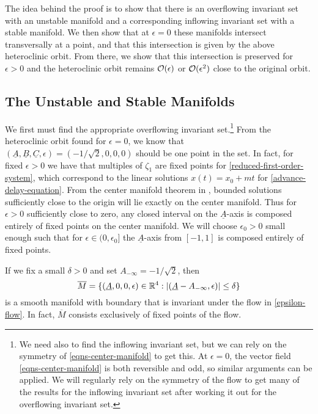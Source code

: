 The idea behind the proof is to show that there is an overflowing invariant set with an unstable manifold and a corresponding inflowing invariant set with a stable manifold. We then show that at \(\epsilon = 0\) these manifolds intersect transversally at a point, and that this intersection is given by the above heteroclinic orbit. From there, we show that this intersection is preserved for \(\epsilon > 0\) and the heteroclinic orbit remains \(\mathcal{O}(\epsilon)\) or \(\mathcal{O}(\epsilon^2)\) close to the original orbit.

\subsection{The Unstable and Stable Manifolds}\label{sec:manifolds}

We first must find the appropriate overflowing invariant set.\footnote{We need also to find the inflowing invariant set, but we can rely on the symmetry of \cref{eqns-center-manifold} to get this. At \(\epsilon = 0\), the vector field \cref{eqns-center-manifold} is both reversible and odd, so similar arguments can be applied. We will regularly rely on the symmetry of the flow to get many of the results for the inflowing invariant set after working it out for the overflowing invariant set.} From the heteroclinic orbit found for \(\epsilon = 0\), we know that \((\underline A,\underline B,\underline C, \epsilon) = (-1/\sqrt 2 , 0 ,0, 0)\) should be one point in the set. In fact, for fixed \(\epsilon> 0\) we have that multiples of \(\zeta_1\) are fixed points for \cref{reduced-first-order-system}, which correspond to the linear solutions \(x(t) = x_0 + mt\) for \cref{advance-delay-equation}. From the center manifold theorem in \cite{vanderbauwhede1992center}, bounded solutions sufficiently close to the origin will lie exactly on the center manifold. Thus for \(\epsilon>0\) sufficiently close to zero, any closed interval on the \(\underline A\)-axis is composed entirely of fixed points on the center manifold. We will choose \(\epsilon_0> 0\) small enough such that for \(\epsilon \in (0,\epsilon_0]\) the \(\underline A\)-axis from \([-1,1]\) is composed entirely of fixed points. 



If we fix a small \(\delta > 0\) and set \(A_{-\infty} = - 1/ \sqrt 2\), then 
\begin{equation}
	\overline M = \{(\underline A, 0, 0, \epsilon) \in \mathbb{R}^4: |(\underline A - A_{-\infty},  \epsilon)| \leq \delta\}
\end{equation}
is a smooth manifold with boundary that is invariant under the flow in \cref{epsilon-flow}. In fact, \(\overline M\) consists exclusively of fixed points of the flow.


